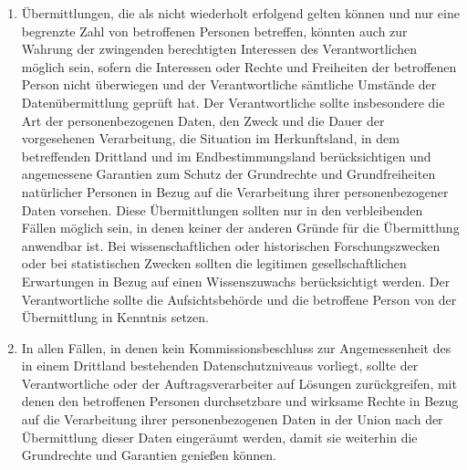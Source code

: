 \begin{enumerate}
   \item Übermittlungen, die als nicht wiederholt erfolgend gelten können und nur eine begrenzte Zahl von betroffenen
    Personen betreffen, könnten auch zur Wahrung der zwingenden berechtigten Interessen des Verantwortlichen möglich
    sein, sofern die Interessen oder Rechte und Freiheiten der betroffenen Person nicht überwiegen und der
    Verantwortliche sämtliche Umstände der Datenübermittlung geprüft hat. Der Verantwortliche sollte insbesondere die
    Art der personenbezogenen Daten, den Zweck und die Dauer der vorgesehenen Verarbeitung, die Situation im
    Herkunftsland, in dem betreffenden Drittland und im Endbestimmungsland berücksichtigen und angemessene Garantien
    zum Schutz der Grundrechte und Grundfreiheiten natürlicher Personen in Bezug auf die Verarbeitung ihrer
    personenbezogener Daten vorsehen. Diese Übermittlungen sollten nur in den verbleibenden Fällen möglich sein, in
    denen keiner der anderen Gründe für die Übermittlung anwendbar ist. Bei wissenschaftlichen oder historischen
    Forschungszwecken oder bei statistischen Zwecken sollten die legitimen gesellschaftlichen Erwartungen in Bezug auf
    einen Wissenszuwachs berücksichtigt werden. Der Verantwortliche sollte die Aufsichtsbehörde und die betroffene
    Person von der Übermittlung in Kenntnis setzen.%
   \label{itm:eg-113}
   

   \item In allen Fällen, in denen kein Kommissionsbeschluss zur Angemessenheit des in einem Drittland bestehenden
    Datenschutzniveaus vorliegt, sollte der Verantwortliche oder der Auftragsverarbeiter auf Lösungen zurückgreifen,
    mit denen den betroffenen Personen durchsetzbare und wirksame Rechte in Bezug auf die Verarbeitung ihrer
    personenbezogenen Daten in der Union nach der Übermittlung dieser Daten eingeräumt werden, damit sie weiterhin die
    Grundrechte und Garantien genießen können.%
   \label{itm:eg-114}
   


\end{enumerate}
